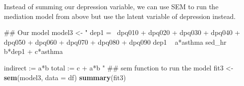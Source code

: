 \documentclass[]{tufte-book}
\newenvironment{Shaded}{}{}
\newcommand{\KeywordTok}[1]{\textcolor[rgb]{0.00,0.44,0.13}{\textbf{#1}}}
\newcommand{\DataTypeTok}[1]{\textcolor[rgb]{0.56,0.13,0.00}{#1}}
\newcommand{\StringTok}[1]{\textcolor[rgb]{0.25,0.44,0.63}{#1}}
\newcommand{\NormalTok}[1]{#1}
\theoremstyle{definition}
\theoremstyle{definition}
\theoremstyle{remark}
\begin{document}
Instead of summing our depression variable, we can use SEM to run the
mediation model from above but use the latent variable of depression
instead.

\begin{Shaded}
\begin{Highlighting}[]
\NormalTok{## Our model}
\NormalTok{model3 <-}\StringTok{ "}
\StringTok{  dep1 =~ dpq010 + dpq020 + dpq030 + dpq040 + dpq050 + dpq060 + dpq070 + dpq080 + dpq090}
\StringTok{  dep1 ~ a*asthma}
\StringTok{  sed_hr ~ b*dep1 + c*asthma}

\StringTok{  indirect := a*b}
\StringTok{  total := c + a*b}
\StringTok{"}
\NormalTok{## sem function to run the model}
\NormalTok{fit3 <-}\StringTok{ }\KeywordTok{sem}\NormalTok{(model3, }\DataTypeTok{data =}\NormalTok{ df)}
\KeywordTok{summary}\NormalTok{(fit3)}
\end{Highlighting}
\end{Shaded}
\end{document}
